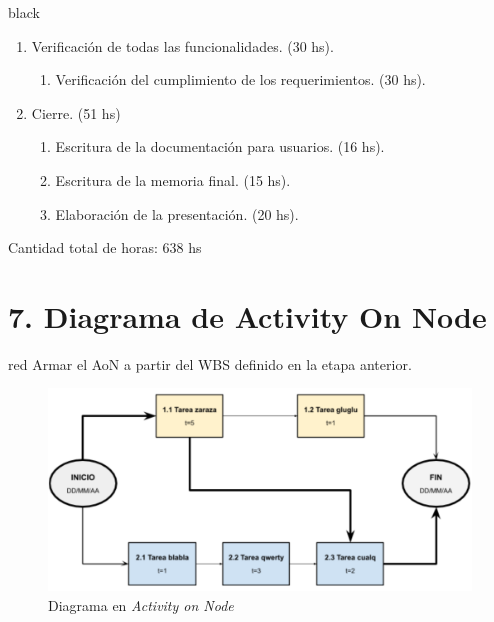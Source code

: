 \documentclass[11pt]{charter}
\begin{document}
\begin{consigna}{black}
\begin{enumerate}
\item Verificación de todas las funcionalidades. (30 hs).
	\begin{enumerate}
	\item Verificación del cumplimiento de los requerimientos.  (30 hs).
	\end{enumerate}		

\item Cierre.  (51 hs)
	\begin{enumerate}
	\item Escritura de la documentación para usuarios. (16 hs).
	\item Escritura de la memoria final. (15 hs).
	\item Elaboración de la presentación. (20 hs).
	\end{enumerate}
	
\end{enumerate}

Cantidad total de horas: 638 hs


\end{consigna}

\section{7. Diagrama de Activity On Node}
\label{sec:AoN}

\begin{consigna}{red}
Armar el AoN a partir del WBS definido en la etapa anterior. 



\end{consigna}

\begin{figure}[htpb]
\centering 
\includegraphics[width=.8\textwidth]{./Figuras/AoN.png}
\caption{Diagrama en \textit{Activity on Node}}
\label{fig:AoN}
\end{figure}
\end{document}

